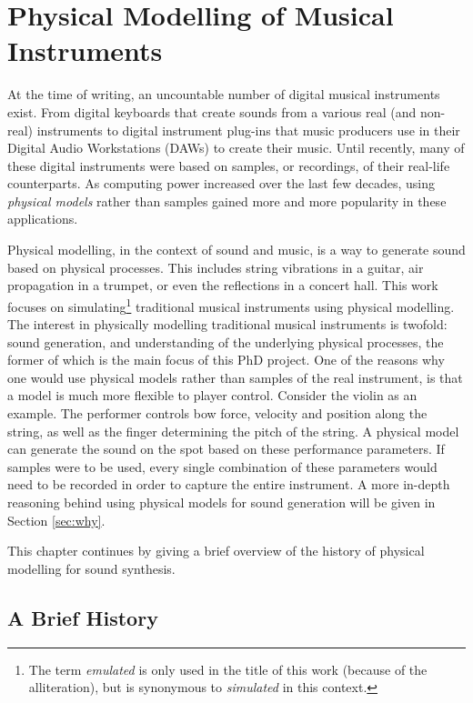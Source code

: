 \chapter{Physical Modelling of Musical Instruments}\label{ch:physMod}
At the time of writing, an uncountable number of digital musical instruments exist. From digital keyboards that create sounds from a various real (and non-real) instruments to digital instrument plug-ins that music producers use in their Digital Audio Workstations (DAWs) to create their music. Until recently, many of these digital instruments were based on samples, or recordings, of their real-life counterparts. As computing power increased over the last few decades, using \textit{physical models} rather than samples gained more and more popularity in these applications.

Physical modelling, in the context of sound and music, is a way to generate sound based on physical processes. This includes string vibrations in a guitar, air propagation in a trumpet, or even the reflections in a concert hall. This work focuses on simulating\footnote{The term \textit{emulated} is only used in the title of this work (because of the alliteration), but is synonymous to \textit{simulated} in this context.} traditional musical instruments using physical modelling. 
The interest in physically modelling traditional musical instruments is twofold: sound generation, and understanding of the underlying physical processes, the former of which is the main focus of this PhD project. One of the reasons why one would use physical models rather than samples of the real instrument, is that a model is much more flexible to player control. Consider the violin as an example. The performer controls bow force, velocity and position along the string, as well as the finger determining the pitch of the string. A physical model can generate the sound on the spot based on these performance parameters. If samples were to be used, every single combination of these parameters would need to be recorded in order to capture the entire instrument.
A more in-depth reasoning behind using physical models for sound generation will be given in Section \ref{sec:why}.

This chapter continues by giving a brief overview of the history of physical modelling for sound synthesis.

\section{A Brief History}\label{sec:history}

